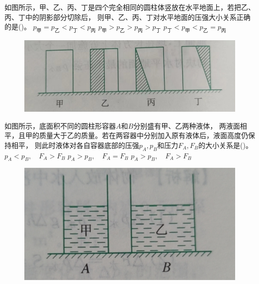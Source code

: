 \documentclass[a4paper,cs4size]{BHCexam}
\begin{document}
\begin{groups}
\begin{questions}[]
        \question[5] 如图所示，甲、乙、丙、丁是四个完全相同的圆柱体竖放在水平地面上，若把乙、丙、丁中的阴影部分切除后，
        则甲、乙、丙、丁对水平地面的压强大小关系正确的是(\quad\quad\quad)。
        {$p_{\text{甲}}=p_{\text{乙}}<p_{\text{丁}}<p_{\text{丙}}$}
        {$p_{\text{甲}}>p_{\text{乙}}>p_{\text{丙}}>p_{\text{丁}}$}
        {$p_{\text{丁}}<p_{\text{甲}}<p_{\text{乙}}=p_{\text{丙}}$}
        \begin{figure}[htb]
            \flushright
            \includegraphics [scale=0.4,trim=0 0 0 0]{./image/physics_pressure_4.png}
            \label{fig:fig_pressure_4}
        \end{figure}
        \vspace{5cm}

        \question[5] 如图所示，底面积不同的圆柱形容器$A$和$B$分别盛有甲、乙两种液体，
        两液面相平，且甲的质量大于乙的质量。若在两容器中分别加入原有液体后，液面高度仍保持相平，
        则此时液体对各自容器底部的压强$p_A, p_B$和压力$F_A, F_B$的大小关系是(\quad\quad\quad)。
        {$p_A<p_B, \quad F_A>F_B$}
        {$p_A>p_B, \quad F_A=F_B$}
        {$p_A>p_B, \quad F_A>F_B$}
        \begin{figure}[htb]
            \flushright
            \includegraphics [scale=0.4,trim=0 0 0 0]{./image/physics_pressure_5.png}
            \label{fig:fig_pressure_5}
        \end{figure}
        \vspace{5cm}


\end{questions}
\end{groups}
\end{document}
